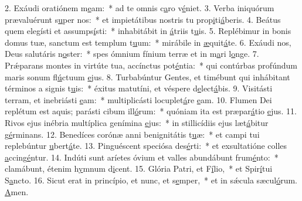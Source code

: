 2. Exáudi oratiónem m\uline{e}am:~* ad te omnis c\uline{a}ro v\uline{é}niet.
3. Verba iniquórum prævaluérunt s\uline{u}per nos:~* et impietátibus nostris tu prop\uline{i}ti\uline{á}beris.
4. Beátus quem elegísti et assumps\uline{í}sti:~* inhabitábit in \uline{á}triis t\uline{u}is.
5. Replébimur in bonis domus tuæ, sanctum est templum t\uline{u}um:~* mirábile in \uline{æ}quit\uline{á}te.
6. Exáudi nos, Deus salutáris n\uline{o}ster:~* spes ómnium fínium terræ et in m\uline{a}ri l\uline{o}nge.
7. Prǽparans montes in virtúte tua, accínctus pot\uline{é}ntia:~* qui contúrbas profúndum maris sonum fl\uline{ú}ctuum \uline{e}jus.
8. Turbabúntur Gentes, et timébunt qui inhábitant términos a signis t\uline{u}is:~* éxitus matutíni, et véspere d\uline{e}lect\uline{á}bis.
9. Visitásti terram, et inebriásti \uline{e}am:~* multiplicásti locuplet\uline{á}re \uline{e}am.
10. Flumen Dei replétum est aquis; parásti cibum ill\uline{ó}rum:~* quóniam ita est præpar\uline{á}tio \uline{e}jus.
11. Rivos ejus inébria multíplica genímina \uline{e}jus:~* in stillicídiis ejus læt\uline{á}bitur g\uline{é}rminans.
12. Benedíces corónæ anni benignitátis t\uline{u}æ:~* et campi tui replebúntur \uline{u}bert\uline{á}te.
13. Pinguéscent speciósa des\uline{é}rti:~* et exsultatióne colles \uline{a}ccing\uline{é}ntur.
14. Indúti sunt aríetes óvium et valles abundábunt frum\uline{é}nto:~* clamábunt, étenim h\uline{y}mnum d\uline{i}cent.
15. Glória Patri, et F\uline{í}lio,~* et Spir\uline{í}tui S\uline{a}ncto.
16. Sicut erat in princípio, et nunc, et s\uline{e}mper,~* et in sǽcula sæcul\uline{ó}rum. \uline{A}men.
